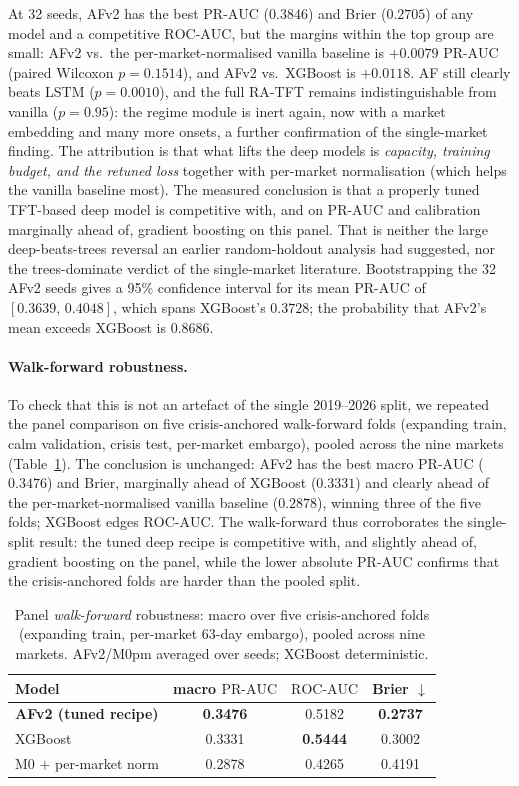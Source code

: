 \documentclass[11pt,a4paper]{article}
\newcommand{\prauc}{\mbox{PR-AUC}}
\newcommand{\rocauc}{\mbox{ROC-AUC}}
\begin{document}
\noindent At 32 seeds, AFv2 has the best $\prauc$ ($0.3846$) and Brier
($0.2705$) of any model and a competitive $\rocauc$, but the margins within the
top group are small: AFv2 vs.\ the per-market-normalised vanilla baseline is
$+0.0079$ $\prauc$ (paired Wilcoxon $p=0.1514$), and AFv2 vs.\ XGBoost is $+0.0118$.
AF still clearly beats LSTM ($p=0.0010$), and the full RA-TFT remains
indistinguishable from vanilla ($p=0.95$): the regime module is inert again,
now with a market embedding and many more onsets, a further confirmation of the
single-market finding. The attribution is that what lifts the deep models is
\emph{capacity, training budget, and the retuned loss} together with per-market
normalisation (which helps the vanilla baseline most). The measured
conclusion is that a properly tuned TFT-based deep model is competitive with,
and on $\prauc$ and calibration marginally ahead of, gradient boosting on this
panel. That is
neither the large deep-beats-trees reversal an earlier random-holdout analysis
had suggested, nor the trees-dominate verdict of the single-market literature. Bootstrapping the 32
AFv2 seeds gives a 95\% confidence interval for its mean $\prauc$ of
$[0.3639,\,0.4048]$, which spans XGBoost's $0.3728$; the probability that AFv2's
mean exceeds XGBoost is $0.8686$.

\paragraph{Walk-forward robustness.} To check that this is not an artefact of
the single 2019--2026 split, we repeated the panel comparison on five
crisis-anchored walk-forward folds (expanding train, calm validation, crisis
test, per-market embargo), pooled across the nine markets
(Table~\ref{tab:panelwf}). The conclusion is unchanged: AFv2 has the best
macro $\prauc$ ($0.3476$) and Brier, marginally ahead of XGBoost ($0.3331$) and
clearly ahead of the per-market-normalised vanilla baseline ($0.2878$), winning
three of the five folds; XGBoost edges $\rocauc$. The walk-forward thus
corroborates the single-split result: the tuned deep recipe is competitive
with, and slightly ahead of, gradient boosting on the panel, while the lower
absolute $\prauc$ confirms that the crisis-anchored folds are harder than the
pooled split.

\begin{table}[h]
\centering\small
\caption{Panel \emph{walk-forward} robustness: macro over five crisis-anchored
folds (expanding train, per-market 63-day embargo), pooled across nine markets.
AFv2/M0pm averaged over seeds; XGBoost deterministic.}
\label{tab:panelwf}
\begin{tabular}{lccc}
\toprule
Model & macro $\prauc$ & $\rocauc$ & Brier $\downarrow$ \\
\midrule
\textbf{AFv2 (tuned recipe)} & \textbf{0.3476} & 0.5182 & \textbf{0.2737} \\
XGBoost                      & 0.3331 & \textbf{0.5444} & 0.3002 \\
M0 $+$ per-market norm       & 0.2878 & 0.4265 & 0.4191 \\
\bottomrule
\end{tabular}
\end{table}
\end{document}
